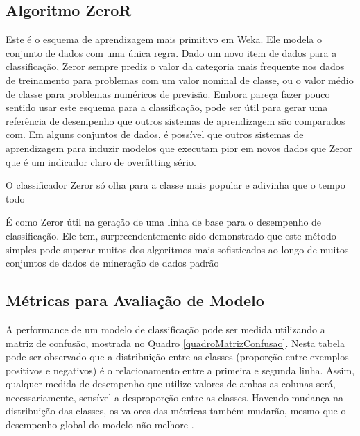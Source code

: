 \documentclass[
	12pt,				%
	openright,			%
	oneside,	
	a4paper,				%
	english,				%
	brazil				%
]{abntex2/abntex2} %
\begin{document}
	\subsection{Algoritmo ZeroR}
	
	 Este é o esquema de aprendizagem mais primitivo em Weka. Ele modela o conjunto de dados com uma única regra. Dado um novo item de dados para a classificação, Zeror sempre prediz o valor da categoria mais frequente nos dados de treinamento para problemas com um valor nominal de classe, ou o valor médio de classe para problemas numéricos de previsão. Embora pareça fazer pouco sentido usar este esquema para a classificação, pode ser útil para gerar uma referência de desempenho que outros sistemas de aprendizagem são comparados com. Em alguns conjuntos de dados, é possível que outros sistemas de aprendizagem para induzir modelos que executam pior em novos dados que Zeror que é um indicador claro de overfitting sério.
	 
	 O classificador Zeror só olha para a classe mais popular e adivinha que o tempo todo
	 
	 É como Zeror útil na geração de uma linha de base para o desempenho de classificação. Ele tem, surpreendentemente sido demonstrado que este método simples pode superar muitos dos algoritmos mais sofisticados ao longo de muitos conjuntos de dados de mineração de dados padrão \cite{witten:2011}
	 
	
	\subsection{Métricas para Avaliação de Modelo}
	
	A performance de um modelo de classificação pode ser medida utilizando a matriz de confusão, mostrada no Quadro \ref{quadroMatrizConfusao}. Nesta tabela pode ser observado que a distribuição entre as classes (proporção entre exemplos positivos e negativos) é o relacionamento entre a primeira e segunda linha. Assim, qualquer medida de desempenho que utilize valores de ambas as colunas será, necessariamente, sensível a desproporção entre as classes. Havendo mudança na distribuição das classes, os valores das métricas também mudarão, mesmo que o desempenho global do modelo não melhore \cite{prati:2008}.
	\\
	
\end{document}
